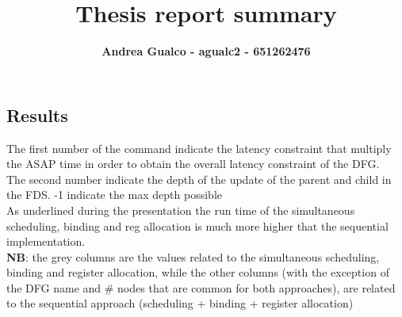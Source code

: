 \documentclass[a4paper, 11pt, oneside]{article}
\title{\textbf{Thesis report summary}}
\author{\textbf{Andrea Gualco - agualc2 - 651262476}}
\begin{document}
\begin{landscape}
\section{Results}
The first number of the command indicate the latency constraint that multiply the ASAP time in order to obtain
the overall latency constraint of the DFG.\\
The second number indicate the depth of the update of the parent and child in the FDS. -1 indicate the max depth possible\\
As underlined during the presentation the run time of the simultaneous scheduling, binding and reg allocation is much more
higher that the sequential implementation.\\
\textbf{NB}: the grey columns are the values related to the simultaneous scheduling, binding and register allocation,
while the other columns (with the exception of the DFG name and \# nodes that are common for both approaches),
are related to the sequential approach (scheduling + binding + register allocation)


\end{landscape}
\end{document}
